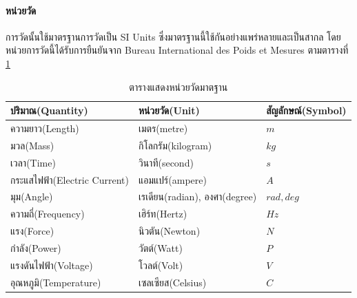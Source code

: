 \paragraph*{หน่วยวัด}
การวัดนั้นใช้มาตรฐานการวัดเป็น SI Units ซึ่งมาตรฐานนี้ใช้กันอย่างแพร่หลายและเป็นสากล โดยหน่วยการวัดนี้ได้รับการยืนยันจาก
Bureau International des Poids et Mesures ตามตารางที่ \ref{tab:standart_unit}

\begin{table}[ht]
	\centering
	\begin{tabular}{| l | l | l |}
		\hline
		ปริมาณ(Quantity)                     & หน่วยวัด(Unit)                      & สัญลักษณ์(Symbol) \\
		\hline
		ความยาว(Length)                    & เมตร(metre)                                 & $m$                                 \\
		มวล(Mass)                                  & กิโลกรัม(kilogram)                  & $kg$                                \\
		เวลา(Time)                               & วินาที(second)                          & $s$                                 \\
		กระแสไฟฟ้า(Electric Current) & แอมแปร์(ampere)                       & $A$                                 \\
		มุม(Angle)                                 & เรเดียน(radian), องศา(degree) & $rad, deg$                          \\
		ความถี่(Frequency)                 & เฮิร์ท(Hertz)                           & $Hz$                                \\
		แรง(Force)                                 & นิวตัน(Newton)                          & $N$                                 \\
		กำลัง(Power)                           & วัตต์(Watt)                               & $P$                                 \\
		แรงดันไฟฟ้า(Voltage)       & โวลต์(Volt)                               & $V$                                 \\
		อุณหภูมิ(Temperature)            & เซลเซียส(Celsius)                   & $C$                                 \\
		\hline
	\end{tabular}
	\caption{ตารางแสดงหน่วยวัดมาตฐาน}
	\label{tab:standart_unit}
\end{table}

